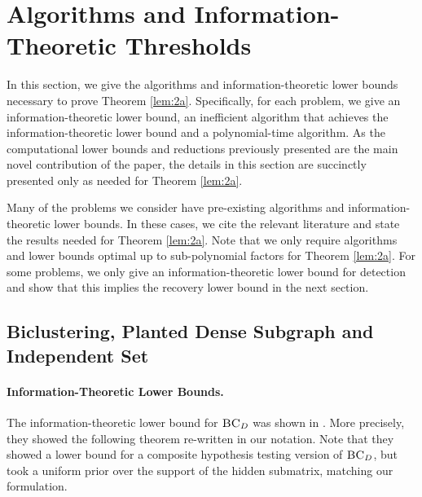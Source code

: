 \section{Algorithms and Information-Theoretic Thresholds}

\label{s:info}

In this section, we give the algorithms and information-theoretic lower bounds necessary to prove Theorem \ref{lem:2a}. Specifically, for each problem, we give an information-theoretic lower bound, an inefficient algorithm that achieves the information-theoretic lower bound and a polynomial-time algorithm. As the computational lower bounds and reductions previously presented are the main novel contribution of the paper, the details in this section are succinctly presented only as needed for Theorem \ref{lem:2a}. 

Many of the problems we consider have pre-existing algorithms and information-theoretic lower bounds. In these cases, we cite the relevant literature and state the results needed for Theorem \ref{lem:2a}. Note that we only require algorithms and lower bounds optimal up to sub-polynomial factors for Theorem \ref{lem:2a}. For some problems, we only give an information-theoretic lower bound for detection and show that this implies the recovery lower bound in the next section.


\subsection{Biclustering, Planted Dense Subgraph and Independent Set}

\paragraph{Information-Theoretic Lower Bounds.} The information-theoretic lower bound for $\textsc{BC}_D$ was shown in \cite{butucea2013detection}. More precisely, they showed the following theorem re-written in our notation. Note that they showed a lower bound for a composite hypothesis testing version of $\textsc{BC}_D$, but took a uniform prior over the support of the hidden submatrix, matching our formulation.

